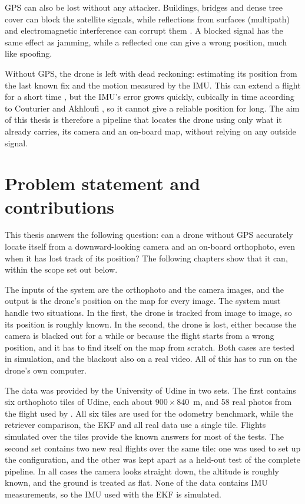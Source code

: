 \documentclass[english, Lau, oneside]{sapthesis}%
\begin{document}
GPS can also be lost without any attacker. Buildings, bridges and dense tree cover can block the satellite signals, while reflections from surfaces (multipath) and electromagnetic interference can corrupt them \citep{couturier2024avl, liu2025survey}. A blocked signal has the same effect as jamming, while a reflected one can give a wrong position, much like spoofing.

Without GPS, the drone is left with dead reckoning: estimating its position from the last known fix and the motion measured by the IMU. This can extend a flight for a short time \citep{szykula2025deadreckoning}, but the IMU's error grows quickly, cubically in time according to Couturier and Akhloufi \citeyearpar{couturier2024avl}, so it cannot give a reliable position for long. The aim of this thesis is therefore a pipeline that locates the drone using only what it already carries, its camera and an on-board map, without relying on any outside signal.

\section{Problem statement and contributions}
\label{sec:intro-problem}
This thesis answers the following question: can a drone without GPS accurately locate itself from a downward-looking camera and an on-board orthophoto, even when it has lost track of its position? The following chapters show that it can, within the scope set out below.

The inputs of the system are the orthophoto and the camera images, and the output is the drone's position on the map for every image. The system must handle two situations. In the first, the drone is tracked from image to image, so its position is roughly known. In the second, the drone is lost, either because the camera is blacked out for a while or because the flight starts from a wrong position, and it has to find itself on the map from scratch. Both cases are tested in simulation, and the blackout also on a real video. All of this has to run on the drone's own computer.

The data was provided by the University of Udine in two sets. The first contains six orthophoto tiles of Udine, each about $900 \times 840$~m, and 58 real photos from the flight used by \citet{fabris2025thesis}. All six tiles are used for the odometry benchmark, while the retriever comparison, the EKF and all real data use a single tile. Flights simulated over the tiles provide the known answers for most of the tests. The second set contains two new real flights over the same tile: one was used to set up the configuration, and the other was kept apart as a held-out test of the complete pipeline. In all cases the camera looks straight down, the altitude is roughly known, and the ground is treated as flat. None of the data contains IMU measurements, so the IMU used with the EKF is simulated.
\end{document}
